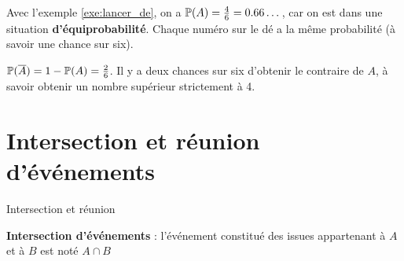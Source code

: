 \documentclass[10pt,a4paper,openany,twoside]{book}
\begin{document}
\begin{ex}{}{}
   Avec l'exemple \ref{exe:lancer_de}, on a $\P(A)=\frac{4}{6}=0.66\dots$, car on est dans une situation \textbf{d'équiprobabilité}. Chaque numéro sur le dé a la même probabilité (à savoir une chance sur six).

   $\P(\overline{A})=1-\P(A) = \frac{2}{6}$. Il y a deux chances sur six d'obtenir le contraire de $A$, à savoir obtenir un nombre supérieur strictement à 4.
\end{ex}

\section{Intersection et réunion d'événements}

\begin{defi}{Intersection et réunion}{}
\begin{minipage}{9cm}
\textbf{Intersection d'événements} : l'événement constitué des issues appartenant à $A$ et à $B$ est noté $A\cap B$

\end{minipage}
\begin{minipage}{5cm}
\begin{center}
\end{center}
\end{minipage}



\end{defi}
\end{document}

